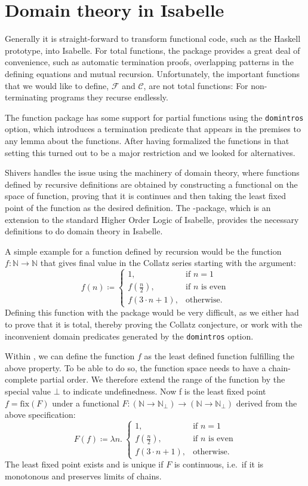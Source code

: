 \documentclass[a4paper,halfparskip,DIV=10,11pt]{scrbook}
\newcommand{\C}{\mathcal C}
\newcommand{\F}{\mathcal F}
\newcommand{\N}{\mathds N}
\newcommand{\da}{\coloneqq}
\begin{document}
\section{Domain theory in Isabelle}

Generally it is straight-forward to transform functional code, such as the Haskell prototype, into Isabelle. For total functions, the  package\citep{isabelle-function} provides a great deal of convenience, such as automatic termination proofs, overlapping patterns in the defining equations and mutual recursion. Unfortunately, the important functions that we would like to define, $\F$ and $\C$, are not total functions: For non-terminating programs they recurse endlessly.

The function package has some support for partial functions using the \texttt{domintros} option, which introduces a termination predicate that appears in the premises to any lemma about the functions. After having formalized the functions in that setting this turned out to be a major restriction and we looked for alternatives.

Shivers handles the issue using the machinery of domain theory, where functions defined by recursive definitions are obtained by constructing a functional on the space of function, proving that it is continues and then taking the least fixed point of the function as the desired definition. The -package\citep{HOLCF}, which is an extension to the standard Higher Order Logic of Isabelle, provides the necessary definitions to do domain theory in Isabelle.

A simple example for a function defined by recursion would be the function $f\colon \N \to \N$ that gives final value in the Collatz series starting with the argument:
\[
f(n) \da 
\begin{cases}
1, &\text{if } n = 1\\
f(\frac n 2), &\text{if $n$ is even} \\
f(3\cdot n + 1), &\text{otherwise}.
\end{cases}
\]
Defining this function with the  package would be very difficult, as we either had to prove that it is total, thereby proving the Collatz conjecture, or work with the inconvenient domain predicates generated by the \texttt{domintros} option.

Within , we can define the function $f$ as the least defined function fulfilling the above property. To be able to do so, the function space needs to have a chain-complete partial order. We therefore extend the range of the function by the special value $\bot$ to indicate undefinedness. Now f is the least fixed point $f = \text{fix}(F)$ under a functional $F\colon (\N \to \N_\bot) \to (\N \to \N_\bot)$ derived from the above specification:
\[
F(f) \da \lambda n.\ 
\begin{cases}
1, &\text{if } n = 1\\
f(\frac n 2), &\text{if $n$ is even} \\
f(3\cdot n + 1), &\text{otherwise}.
\end{cases}
\]
The least fixed point exists and is unique if $F$ is continuous, i.e.\ if it is monotonous and preserves limits of chains.
\end{document}
